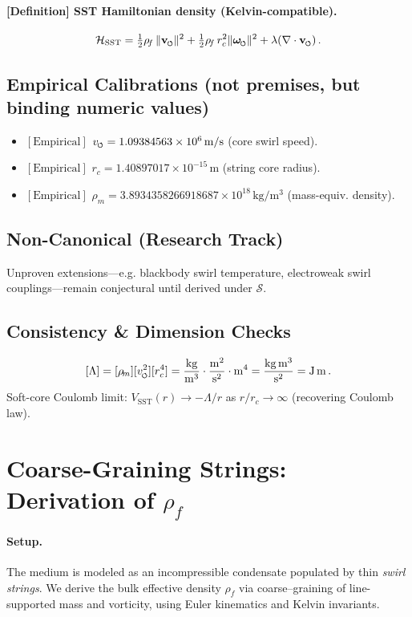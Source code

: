 \documentclass[11pt]{article}
\newcommand{\swirlarrow}{%
     \mathchoice{\mkern-2mu\scriptstyle\boldsymbol{\circlearrowleft}}%
                {\mkern-2mu\scriptstyle\boldsymbol{\circlearrowleft}}%
                {\mkern-2mu\scriptscriptstyle\boldsymbol{\circlearrowleft}}%
                {\mkern-2mu\scriptscriptstyle\boldsymbol{\circlearrowleft}}%
}
\newcommand{\vswirl}{\mathbf{v}_{\swirlarrow}}
\newcommand{\omegas}{\boldsymbol{\omega}_{\swirlarrow}}  %
\newcommand{\vscore}{v_{\swirlarrow}}                    %
\newcommand{\rhof}{\rho_{\!f}}                           %
\newcommand{\rhom}{\rho_{\!m}}                           %
\newcommand{\rc}{r_c}                                    %
\begin{document}
\paragraph{[Definition] SST Hamiltonian density (Kelvin-compatible).}
    \[
        \mathcal{H}_{\text{SST}} = \tfrac{1}{2}\rhof\,\|\vswirl\|^2 + \tfrac{1}{2}\rhof\,\rc^2\|\omegas\|^2 + \lambda(\nabla\cdot\vswirl)\,.
    \]

\subsection*{Empirical Calibrations (not premises, but binding numeric values)}
\begin{itemize}
    \item $[\text{Empirical}] $ $\vscore = 1.09384563\times 10^6\,\mathrm{ m/s } $ (core swirl speed).
    \item $[\text{Empirical}]$ $\rc = 1.40897017\times 10^{-15}\,\mathrm{m}$ (string core radius).
    \item $[\text{Empirical}]$ $\rhom = 3.8934358266918687\times 10^{18}\,\mathrm{kg/m^3}$ (mass-equiv. density).
\end{itemize}

\subsection*{Non-Canonical (Research Track)}
Unproven extensions—e.g. blackbody swirl temperature, electroweak swirl couplings—remain conjectural until derived under $\mathcal{S}$.

\subsection*{Consistency \& Dimension Checks}
\[
    [\Lambda] = [\rhom][\vscore^2][\rc^4]
    = \frac{\mathrm{kg}}{\mathrm{m^3}}\cdot\frac{\mathrm{m^2}}{\mathrm{s^2}}\cdot \mathrm{m^4}
    = \frac{\mathrm{kg\,m^3}}{\mathrm{s^2}}
    = \mathrm{J\,m}\,.
\]
Soft-core Coulomb limit: $V_{\text{SST}}(r)\to -\Lambda/r$ as $r/\rc\to\infty$ (recovering Coulomb law).

\section{Coarse-Graining Strings: Derivation of $\rhof$}
\label{sec:canon_rhof_from_strings}
\paragraph{Setup.}
    The medium is modeled as an incompressible condensate populated by thin \emph{swirl strings}. We derive the bulk effective density $\rhof$ via coarse–graining of line-supported mass and vorticity, using Euler kinematics and Kelvin invariants.
\end{document}
